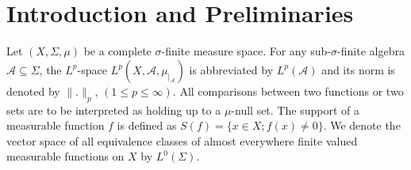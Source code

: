 \documentclass{amsart}
\theoremstyle{definition}\newtheorem{defn}[thm]{Definition}
\theoremstyle{remark}
\numberwithin{equation}{section}
\begin{document}
\section{ \sc\bf Introduction and Preliminaries}
%
%
%
%
Let $(X,\Sigma,\mu)$ be a complete $\sigma$-finite measure space.
For any sub-$\sigma$-finite algebra $\mathcal{A}\subseteq
 \Sigma$, the $L^p$-space
$L^p(X,\mathcal{A},\mu_{\mid_{\mathcal{A}}})$ is abbreviated  by
$L^p(\mathcal{A})$ and its norm is denoted by $\|.\|_p$, $(1\leq p\leq \infty)$. All
comparisons between two functions or two sets are to be
interpreted as holding up to a $\mu$-null set. The support of a
measurable function $f$ is defined as $S(f)=\{x\in X; f(x)\neq
0\}$. We denote the vector space of all equivalence classes of
almost everywhere finite valued measurable functions on $X$ by
$L^0(\Sigma)$.
\end{document}
